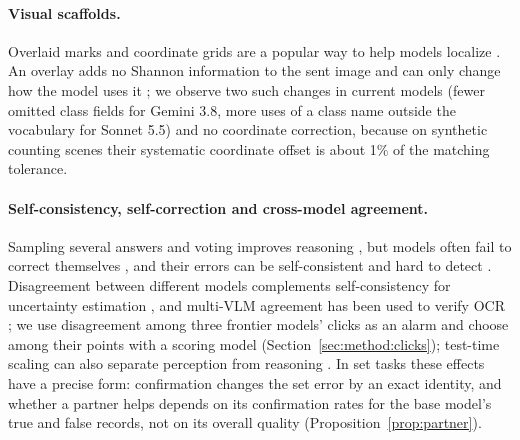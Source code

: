 \paragraph{Visual scaffolds.} Overlaid marks and coordinate grids are a popular way to help models localize \citep{yang2023setofmark,lei2025scaffold}. An overlay adds no Shannon information to the sent image and can only change how the model uses it \citep{shi2026zoomin}; we observe two such changes in current models (fewer omitted class fields for Gemini 3.8, more uses of a class name outside the vocabulary for Sonnet 5.5) and no coordinate correction, because on synthetic counting scenes their systematic coordinate offset is about 1\% of the matching tolerance.

\paragraph{Self-consistency, self-correction and cross-model agreement.} Sampling several answers and voting improves reasoning \citep{wang2023selfconsistency}, but models often fail to correct themselves \citep{huang2024cannot,madaan2023selfrefine,liao2025selfcorrect}, and their errors can be self-consistent and hard to detect \citep{tooconsistent2025,consistentwrong2026}. Disagreement between different models complements self-consistency for uncertainty estimation \citep{hamidieh2026complementing}, and multi-VLM agreement has been used to verify OCR \citep{zhang2026consensus}; we use disagreement among three frontier models' clicks as an alarm and choose among their points with a scoring model (Section~\ref{sec:method:clicks}); test-time scaling can also separate perception from reasoning \citep{sparc2026}. In set tasks these effects have a precise form: confirmation changes the set error by an exact identity, and whether a partner helps depends on its confirmation rates for the base model's true and false records, not on its overall quality (Proposition~\ref{prop:partner}).

